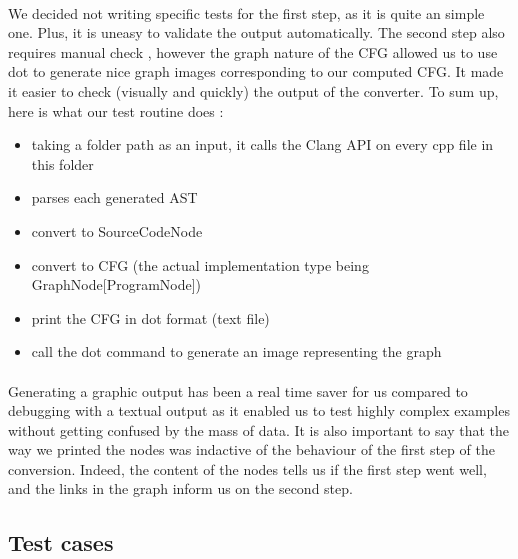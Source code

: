 \documentclass{report}
\begin{document}
\paragraph{}
\hspace{4mm}We decided not writing specific tests for the first step, as it is quite an simple one. Plus, it is uneasy to
validate the output automatically. The second step also requires manual check , however the graph nature of the CFG allowed us to use dot to generate nice graph images
corresponding to our computed CFG. It made it easier to check (visually and quickly) the output of the converter.
To sum up, here is what our test routine does :

\vspace{1.5mm}
\begin{itemize}
\item taking a folder path as an input, it calls the Clang API on every cpp file in this folder\vspace{1mm}
\item parses each generated AST\vspace{1mm}
\item convert to SourceCodeNode\vspace{1mm}
\item convert to CFG (the actual implementation type being 	GraphNode[ProgramNode])\vspace{1mm}
\item print the CFG in dot format (text file)\vspace{1mm}
\item call the dot command to generate an image representing the graph\vspace{1mm}
\end{itemize}

\paragraph{}
\hspace{4mm}Generating a graphic output has been a real time saver for us compared to debugging with a textual output as it enabled
us to test highly complex examples without getting confused by the mass of data. It is also important to say that
the way we printed the nodes was indactive of the behaviour of the first step of the conversion. Indeed, the content of the nodes
tells us if the first step went well, and the links in the graph inform us on the second step.

\subsection{Test cases}
\end{document}
